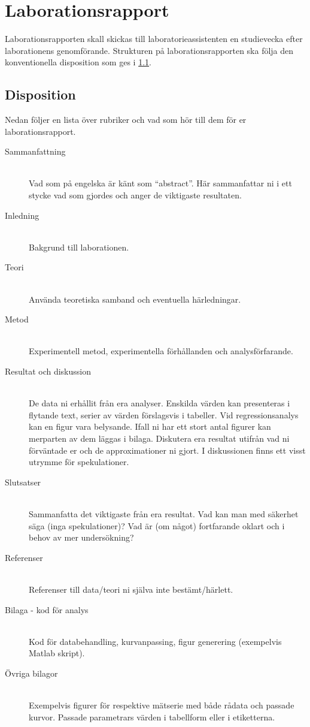 \section{Laborationsrapport}
\label{sec:rapport}
Laborationsrapporten skall skickas till laboratorieassistenten en
studievecka efter laborationens genomförande. Strukturen på
laborationsrapporten ska följa den konventionella disposition som ges i 
\cref{sec:rapport-disposition}.

\subsection{Disposition}
\label{sec:rapport-disposition}
Nedan följer en lista över rubriker och vad som hör till dem för er
laborationsrapport. 
\begin{description}
  \item[Sammanfattning] \hfill \\
    Vad som på engelska är känt som ``abstract''. Här sammanfattar ni i
    ett stycke vad som gjordes och anger de viktigaste resultaten.
  \item[Inledning] \hfill \\ 
    Bakgrund till laborationen.
  \item[Teori] \hfill \\ 
    Använda teoretiska samband och eventuella härledningar.
  \item[Metod] \hfill \\ 
    Experimentell metod, experimentella förhållanden och analysförfarande.
  \item[Resultat och diskussion] \hfill \\ 
    De data ni erhållit från era analyser. Enskilda värden kan
    presenteras i flytande text, serier av värden förslagsvis i tabeller.
    Vid regressionsanalys kan en figur vara belysande. Ifall ni har
    ett stort antal figurer kan merparten av dem läggas i
    bilaga. Diskutera era resultat utifrån vad ni förväntade er och de
    approximationer ni gjort. I diskussionen finns ett visst utrymme för
    spekulationer.
  \item[Slutsatser] \hfill \\ 
    Sammanfatta det viktigaste från era resultat. Vad kan man med säkerhet
    säga (inga spekulationer)? Vad är (om något) fortfarande oklart och i
    behov av mer undersökning?
  \item[Referenser] \hfill \\
    Referenser till data/teori ni själva inte bestämt/härlett.
  \item[Bilaga - kod för analys] \hfill \\
    Kod för databehandling, kurvanpassing, figur generering (exempelvis
    Matlab skript).
  \item[Övriga bilagor] \hfill \\
    Exempelvis figurer för respektive mätserie med både rådata och
    passade kurvor. Passade parametrars värden i tabellform eller i
    etiketterna.
\end{description}

